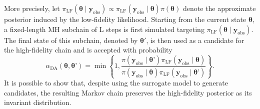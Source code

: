 \documentclass{elsarticle}
\begin{document}
More precisely, let $
\label{eq:lf-posterior}
\pi_{\mathrm{LF}}(\boldsymbol{\theta}\mid\mathbf y_{\mathrm{obs}})
\propto
\pi_{\mathrm{LF}}(\mathbf y_{\mathrm{obs}}\mid\boldsymbol{\theta})
\pi(\boldsymbol{\theta}) $
denote the approximate posterior induced by the low-fidelity likelihood. Starting from the current state $\boldsymbol{\theta}$, a fixed-length MH subchain of L steps is first simulated targeting $\pi_{\mathrm{LF}}(\boldsymbol{\theta}\mid\mathbf y_{\mathrm{obs}})$. The final state of this subchain, denoted by $\boldsymbol{\theta}'$, is then used as a candidate for the high-fidelity chain and is accepted with probability
\begin{equation}
\label{eq:da-acceptance}
\alpha_{\mathrm{DA}}(\boldsymbol{\theta},\boldsymbol{\theta}’)
=
\min\left\{
1,
\frac{
\pi(\mathbf y_{\mathrm{obs}}\mid\boldsymbol{\theta}’)
\pi_{\mathrm{LF}}(\mathbf y_{\mathrm{obs}}\mid\boldsymbol{\theta})
}{
\pi(\mathbf y_{\mathrm{obs}}\mid\boldsymbol{\theta})
\pi_{\mathrm{LF}}(\mathbf y_{\mathrm{obs}}\mid\boldsymbol{\theta}’)
}
\right\}.
\end{equation}
It is possible to show that, despite using the surrogate model to generate candidates, the resulting Markov chain preserves the high-fidelity posterior as its invariant distribution.
\end{document}
